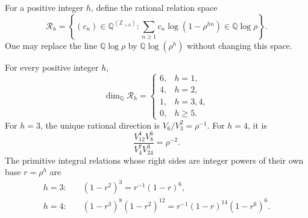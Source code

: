 For a positive integer $h$, define the rational relation space
\begin{equation}
 \mathcal R_h=
 \left\{(c_n)\in\mathbb Q^{(\mathbb Z_{>0})}:
  \sum_{n\ge1}c_n\log(1-\rho^{hn})
      \in\mathbb Q\log\rho\right\}.
 \label{golden:eq:restricted-space}
\end{equation}
One may replace the line $\mathbb Q\log\rho$ by
$\mathbb Q\log(\rho^h)$ without changing this space.

\begin{theorem}
\label{golden:thm:power-ranks}
For every positive integer $h$,
\begin{equation}
 \dim_{\mathbb Q}\mathcal R_h=
 \begin{cases}
 6,&h=1,\\
 4,&h=2,\\
 1,&h=3,4,\\
 0,&h\ge5.
 \end{cases}
 \label{golden:eq:power-ranks}
\end{equation}
For $h=3$, the unique rational direction is
$V_6/V_3^2=\rho^{-1}$.
For $h=4$, it is
\begin{equation}
 \frac{V_{12}^4V_8^6}{V_4^7V_{24}^3}=\rho^{-2}.
 \label{golden:eq:power-four-direction}
\end{equation}
The primitive integral relations whose right sides are integer powers
of their own base $r=\rho^h$ are
\begin{align}
 h=3:\quad &(1-r^2)^3=r^{-1}(1-r)^6,
 \label{golden:eq:power-three-integral}\\
 h=4:\quad &(1-r^3)^8(1-r^2)^{12}
       =r^{-1}(1-r)^{14}(1-r^6)^6.
 \label{golden:eq:power-four-integral}
\end{align}
\end{theorem}

